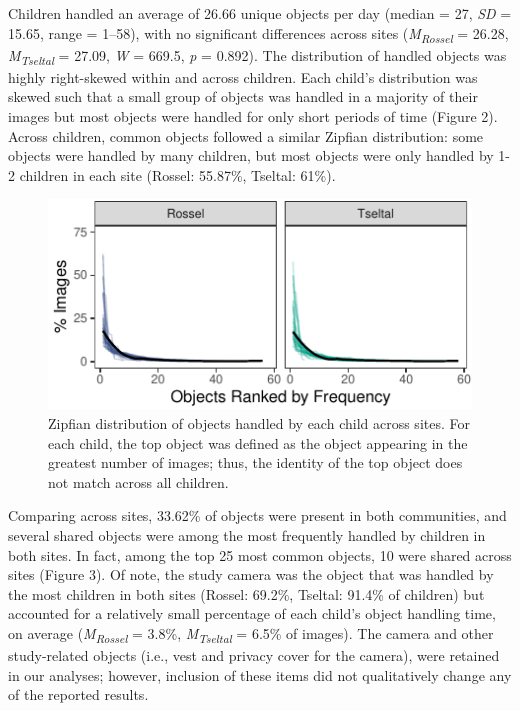 \documentclass[10pt, letterpaper]{article}
\newenvironment{CodeChunk}{}{}
\begin{document}
Children handled an average of 26.66 unique objects per day (median =
27, \emph{SD} = 15.65, range = 1--58), with no significant differences
across sites (\emph{M}\textsubscript{\emph{Rossel}} = 26.28,
\emph{M}\textsubscript{\emph{Tseltal}} = 27.09, \emph{W} = 669.5,
\emph{p} = 0.892). The distribution of handled objects was highly
right-skewed within and across children. Each child's distribution was
skewed such that a small group of objects was handled in a majority of
their images but most objects were handled for only short periods of
time (Figure 2). Across children, common objects followed a similar
Zipfian distribution: some objects were handled by many children, but
most objects were only handled by 1-2 children in each site (Rossel:
55.87\%, Tseltal: 61\%).

\begin{CodeChunk}
\begin{figure}[h]

{\centering \includegraphics{figs/zipfian-objects-fig-1} 

}

\caption[Zipfian distribution of objects handled by each child across sites]{Zipfian distribution of objects handled by each child across sites. For each child, the top object was defined as the object appearing in the greatest number of images; thus, the identity of the top object does not match across all children.}\label{fig:zipfian-objects-fig}
\end{figure}
\end{CodeChunk}

Comparing across sites, 33.62\% of objects were present in both
communities, and several shared objects were among the most frequently
handled by children in both sites. In fact, among the top 25 most common
objects, 10 were shared across sites (Figure 3). Of note, the study
camera was the object that was handled by the most children in both
sites (Rossel: 69.2\%, Tseltal: 91.4\% of children) but accounted for a
relatively small percentage of each child's object handling time, on
average (\emph{M}\textsubscript{\emph{Rossel}} = 3.8\%,
\emph{M}\textsubscript{\emph{Tseltal}} = 6.5\% of images). The camera
and other study-related objects (i.e., vest and privacy cover for the
camera), were retained in our analyses; however, inclusion of these
items did not qualitatively change any of the reported results.
\end{document}
